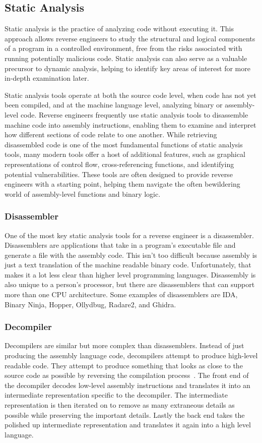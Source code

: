 \subsection{Static Analysis}

Static analysis is the practice of analyzing code without executing it. This approach allows reverse engineers to study the structural and logical components of a program in a controlled environment, free from the risks associated with running potentially malicious code. Static analysis can also serve as a valuable precursor to dynamic analysis, helping to identify key areas of interest for more in-depth examination later.

Static analysis tools operate at both the source code level, when code has not yet been compiled, and at the machine language level, analyzing binary or assembly-level code. Reverse engineers frequently use static analysis tools to disassemble machine code into assembly instructions, enabling them to examine and interpret how different sections of code relate to one another. While retrieving disassembled code is one of the most fundamental functions of static analysis tools, many modern tools offer a host of additional features, such as graphical representations of control flow, cross-referencing functions, and identifying potential vulnerabilities. These tools are often designed to provide reverse engineers with a starting point, helping them navigate the often bewildering world of assembly-level functions and binary logic.

\subsubsection{Disassembler}
One of the most key static analysis tools for a reverse engineer is a disassembler. 
Disassemblers are applications that take in a program’s executable file and generate a file with the assembly code.
This isn’t too difficult because assembly is just a text translation of the machine readable binary code. 
Unfortunately, that makes it a lot less clear than higher level programming languages.  
Disassembly is also unique to a person’s processor, but there are disassemblers that can support more than one CPU architecture.
Some examples of disassemblers are IDA, Binary Ninja, Hopper, Ollydbug, Radare2, and Ghidra.

\subsubsection{Decompiler}
Decompilers are similar but more complex than disassemblers.
Instead of just producing the assembly language code, decompilers attempt to produce high-level readable code. 
They attempt to produce something that looks as close to the source code as possible by reversing the compilation process~\cite{Reversing}.
The front end of the decompiler decodes low-level assembly instructions and translates it into an intermediate representation specific to the decompiler. 
The intermediate representation is then iterated on to remove as many extraneous details as possible while preserving the important details. 
Lastly the back end takes the polished up intermediate representation and translates it again into a high level language.


